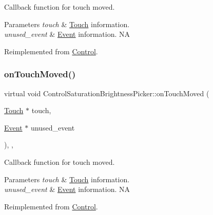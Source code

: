Callback function for touch moved.


\begin{DoxyParams}{Parameters}
{\em touch} & \hyperlink{classTouch}{Touch} information. \\
\hline
{\em unused\+\_\+event} & \hyperlink{classEvent}{Event} information.  NA \\
\hline
\end{DoxyParams}


Reimplemented from \hyperlink{classControl_a26d2e6af053319dc605949678f726622}{Control}.

\mbox{\label{classControlSaturationBrightnessPicker_a1330b4d2fca4a1a312b1594e6ee6b99c}} 
\subsubsection{\texorpdfstring{on\+Touch\+Moved()}{onTouchMoved()}\hspace{0.1cm}{\footnotesize\ttfamily [2/2]}}
{\footnotesize\ttfamily virtual void Control\+Saturation\+Brightness\+Picker\+::on\+Touch\+Moved (\begin{DoxyParamCaption}\item[{\hyperlink{classTouch}{Touch} $\ast$}]{touch,  }\item[{\hyperlink{classEvent}{Event} $\ast$}]{unused\+\_\+event }\end{DoxyParamCaption})\hspace{0.3cm}{\ttfamily [override]}, {\ttfamily [protected]}, {\ttfamily [virtual]}}

Callback function for touch moved.


\begin{DoxyParams}{Parameters}
{\em touch} & \hyperlink{classTouch}{Touch} information. \\
\hline
{\em unused\+\_\+event} & \hyperlink{classEvent}{Event} information.  NA \\
\hline
\end{DoxyParams}


Reimplemented from \hyperlink{classControl_a26d2e6af053319dc605949678f726622}{Control}.

\mbox{\label{classControlSaturationBrightnessPicker_af272e7bef89c1bcf19354bfaa76ebcb2}} 
